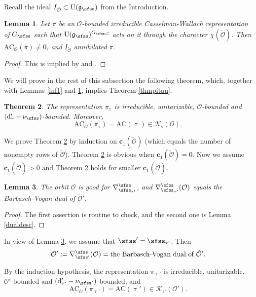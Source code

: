 \documentclass[12pt,a4paper]{amsart}
\newcommand{\CK}{{\mathcal {K}}}
\newcommand{\CO}{{\mathcal {O}}}
\newcommand{\oU}{\operatorname{U}}
\newcommand{\g}{\mathfrak g}
\numberwithin{equation}{section}
\newtheorem{thm}{Theorem}[section]
\newtheorem{lem}[thm]{Lemma}
\theoremstyle{remark}
\begin{document}
Recall the ideal $I_{\check \CO}\subset \oU(\g_\sfss)$ from the Introduction. 
\begin{lem}\label{inf2}
Let $\pi$ be an $\CO$-bounded irreducible Casselman-Wallach representation of $G_{\sfss}$ such that $\oU(\g_\sfss)^{G_{\sfss, \C}}$ acts on it  through the character $\chi(\check \CO)$. Then $\mathrm{AC}_{\CO}(\pi)\neq 0$, and  $I_{\check \CO}$ annihilated $\pi$. 
\end{lem}
\begin{proof}
This is implied by \cite[Korollar 3.6]{BK} and \cite[Theorem 8.4]{Vo89}. 

\end{proof}


We will prove in the rest of this subsection the following theorem, which, together with Lemmas \ref{inf1} and \ref{inf2},  implies  Theorem \ref{thmpitau}. 
\begin{thm}\label{thmpitau222}
The representation $\pi_\uptau$ is irreducible, unitarizable, $\CO$-bounded and $( \mathrm d'_\tau-\nu_{\sfss})$-bounded.     Moreover,
\[
\mathrm{AC}_\CO(\pi_\uptau)=\mathrm{AC}(\uptau)\in \CK_{\mathsf s}(\CO).
\]
\end{thm}

We prove Theorem \ref{thmpitau222} by induction on $\mathbf c_1(\check \CO)$ (which equals the number of nonempty rows of $\check \CO$).  Theorem \ref{thmpitau222} is obvious when $\mathbf c_1(\check \CO)=0$. Now we assume $\mathbf c_1(\check \CO)>0$ and Theorem \ref{thmpitau222} holds for  smaller $\mathbf c_1(\check \CO)$. 

 \begin{lem}\label{lem78}
 The orbit $\CO$ is good for $\nabla^\sfss_{\sfss_{\tau'}}$, and $\nabla^\sfss_{\sfss_{\tau'}}(\CO)$ equals the Barbasch-Vogan dual  of $\check \CO'$. 
 \end{lem}
\begin{proof}
The first assertion is routine to check, and the second one is Lemma \ref{dualdesc}. %
\end{proof}

In view of Lemma \ref{lem78}, we assume that $\sfss'=\sfss_{\tau'}$. Then   
\[
\CO':= \nabla^\sfss_{\sfss'}(\CO)=\textrm{the Barbasch-Vogan dual  of $\check \CO'$}.
\]



By the induction hypothesis, the representation $\pi_{\uptau'}$ is irreducible, unitarizable, $\CO'$-bounded and $( \mathrm d'_{\tau'}-\nu_{\sfss'})$-bounded,     and
\[
\mathrm{AC}_\CO(\pi_{\uptau'})=\mathrm{AC}(\uptau')\in \CK_{\mathsf s'}(\CO').
\]
\end{document}
